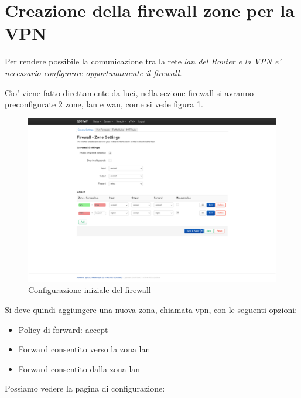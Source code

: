 \section{Creazione della firewall zone per la VPN} 

Per rendere possibile la comunicazione tra la rete \it{lan} del \it{Router} e la VPN e' necessario configurare opportunamente il firewall.

Cio' viene fatto direttamente da luci, nella sezione firewall si avranno preconfigurate 2 zone, lan e wan, come si vede figura \ref{fig:luci-firewall-init}.

\begin{figure}[H]
    \centering
    \includegraphics[width=0.9\linewidth]{immagini/LuCI_firewall_init}
    \caption{Configurazione iniziale del firewall}
    \label{fig:luci-firewall-init}
\end{figure}

Si deve quindi aggiungere una nuova zona, chiamata vpn, con le seguenti opzioni:
\begin{itemize}
    \item Policy di forward: accept
    \item Forward consentito verso la zona lan
    \item Forward consentito dalla zona lan
\end{itemize}

Possiamo vedere la pagina di configurazione:


